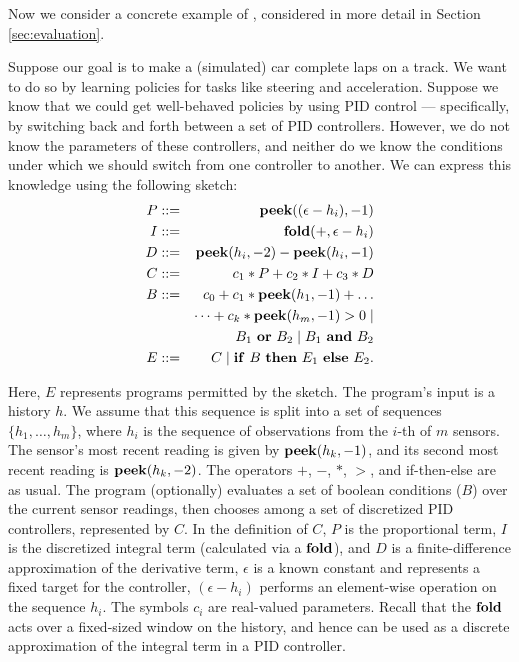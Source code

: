 Now we consider a concrete example of \sygurl, considered in more detail in  Section \ref{sec:evaluation}. 

Suppose our goal is to make a (simulated) car complete laps on a track. We want to do so by learning policies for tasks like steering and acceleration.
Suppose we know that we could get well-behaved policies by using PID control --- specifically, by switching back and forth between a set of PID controllers. However, we do not know the parameters of these controllers, and neither do we know the conditions under which we should switch from one controller to another.
We can express this knowledge using the following sketch:
\begin{eqnarray*}
P & ::= & \mathbf{peek}((\epsilon - h_i), -1) \\
I & ::= & \mathbf{fold}(+, \epsilon - h_i) \\
D & ::= & \mathbf{peek}(h_i, -2)- \mathbf{peek}(h_i, -1) \\
C &::=& c_1 * P + c_2 * I + c_3 * D \\
B & ::=  & c_0 + c_1 * \mathbf{peek}(h_1, -1) + \dots  \\
& & \dots + c_k * \mathbf{peek}(h_m, -1) > 0 \mid \\
& & \qquad B_1 ~\mathbf{or}~ B_2 \mid B_1 ~\mathbf{and}~ B_2 \\
E  & ::= & C \mid \mathbf{if}~B~\mathbf{then}~E_1~\mathbf{else}~E_2. 
\end{eqnarray*}

Here, $E$ represents programs permitted by the sketch. The program's
input is a history $h$. We assume that this sequence is split into a
set of sequences $\{h_1, \dots, h_m\}$,  where $h_i$ is the sequence
of observations from the $i$-th of $m$ sensors. The sensor's most recent reading is given by $\mathbf{peek}(h_k, -1)$, and its second most recent reading is $\mathbf{peek}(h_k, -2)$. 
The operators $+$, $-$, $*$, $>$, and if-then-else are as usual. 
The program (optionally) evaluates a set of boolean conditions  ($B$)
over the current sensor readings, then chooses among a set of discretized PID
controllers, represented by $C$. 
In the definition of $C$, $P$ is the proportional term, $I$ is the discretized
integral term (calculated via a $\mathbf{fold}$), and $D$ is a
finite-difference approximation of the derivative term, $\epsilon$ is a known constant and represents a fixed target for the controller, $(\epsilon - h_i)$ performs an element-wise operation on the sequence $h_i$. The symbols $c_i$ are real-valued parameters. Recall that the $\mathbf{fold}$ acts over a fixed-sized window on the history, and hence can be used as a discrete approximation of the integral term in a PID controller.


